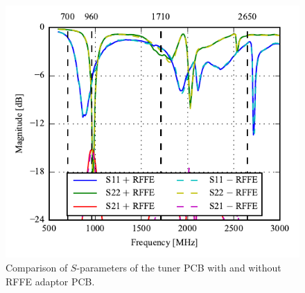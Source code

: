 \begin{figure}[htbp]
    \centering
    \includegraphics{img/optical_rffe/compare_sparams2}
    \caption{Comparison of $S$-parameters of the tuner PCB with and without RFFE adaptor PCB. }
    \label{fig:rffe_test_results2}
\end{figure}
